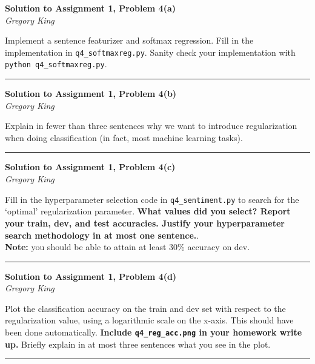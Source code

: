 \documentclass[letter,12pt]{article}
\newcommand{\myhwtitle}[3]
{\begin{center}
{\large {\bf Solution to Assignment {#1}, Problem {#2}}}\\
\medskip 
{\it {#3}} %
\end{center}}
\begin{document}
\myhwtitle{1}{4(a)}{Gregory King}

\bigskip
\noindent Implement a sentence featurizer and softmax regression. Fill in the implementation in \texttt{q4\_softmaxreg.py}. Sanity check your implementation with \texttt{python q4\_softmaxreg.py}.\vspace{5mm}

\noindent\rule{\textwidth}{0.4pt}\vspace{5mm}

\clearpage

\myhwtitle{1}{4(b)}{Gregory King}
\bigskip
\noindent Explain in fewer than three sentences why we want to introduce regularization when doing classification (in fact, most machine learning tasks).\vspace{5mm}

\noindent\rule{\textwidth}{0.4pt}\vspace{5mm}
\clearpage

\myhwtitle{1}{4(c)}{Gregory King}
\bigskip
\noindent Fill in the hyperparameter selection code in \texttt{q4\_sentiment.py} to search for the `optimal' regularization parameter. \textbf{What values did you select? Report your train, dev, and test accuracies. Justify your hyperparameter search methodology in at most one sentence.}. \\

\noindent\textbf{Note:} you should be able to attain at least 30\% accuracy on dev.\vspace{5mm}

\noindent\rule{\textwidth}{0.4pt}\vspace{5mm}

\clearpage

\myhwtitle{1}{4(d)}{Gregory King}
\bigskip
\noindent Plot the classification accuracy on the train and dev set with respect to the regularization value, using a logarithmic scale on the x-axis. This should have been done automatically. \textbf{Include \texttt{q4\_reg\_acc.png} in your homework write up.} Briefly explain in at most three sentences what you see in the plot.\vspace{5mm}

\noindent\rule{\textwidth}{0.4pt}\vspace{5mm}

\end{document}
